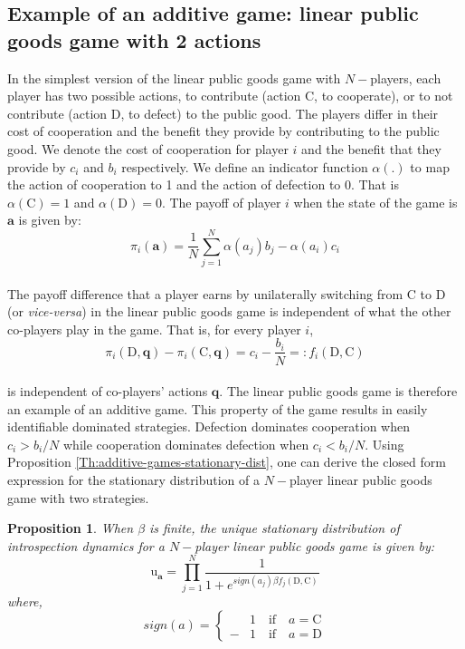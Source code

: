 \documentclass[11pt]{article}
\theoremstyle{plainCl1}
\newtheorem{Prop}{Proposition}
\theoremstyle{plainCl2}
\newcommand{\abf}{\mathbf{a}}
\newcommand{\qbf}{\mathbf{q}}
\newcommand{\C}{\mathrm{C}}
\newcommand{\D}{\mathrm{D}}
\begin{document}
\subsection*{Example of an additive game: linear public goods game with 2 actions}
In the simplest version of the linear public goods game with $N-$players, each player has two possible actions, to contribute (action $\C$, to cooperate), or to not contribute (action $\D$, to defect) to the public good. The players differ in their cost of cooperation and the benefit they provide by contributing to the public good. We denote the cost of cooperation for player $i$ and the benefit that they provide by $c_i$ and $b_i$ respectively. We define an indicator function $\alpha(.)$ to map the action of cooperation to 1 and the action of defection to 0. That is $\alpha(\C) = 1$ and $\alpha(\D) = 0$.  The payoff of player $i$ when the state of the game is $\abf$ is given by: \\
\begin{equation}
\pi_i(\abf) = \frac{1}{N}\sum_{j=1}^N \displaystyle \alpha(a_j) b_j - \alpha(a_i) c_i
\label{Eq:linear-pgg-payoff}
\end{equation}
\\
\noindent The payoff difference that a player earns by unilaterally switching from $\C$ to $\D$ (or \emph{vice-versa}) in the linear public goods game is independent of what the other co-players play in the game. That is, for every player $i$,
\begin{equation}
\pi_i(\D, \qbf) - \pi_i(\C, \qbf) = c_i - \frac{b_i}{N} =: f_i(\D, \C) 
\label{Eq:difference-payoffs-lpgg}
\end{equation}\\
\noindent is independent of co-players' actions $\qbf$. The linear public goods game is therefore an example of an additive game. This property of the game results in easily identifiable dominated strategies. Defection dominates cooperation when $c_i > b_i/N$ while cooperation dominates defection when $c_i < b_i/N$. Using Proposition \ref{Th:additive-games-stationary-dist}, one can derive the closed form expression for the stationary distribution of a $N-$player linear public goods game with two strategies. 
\begin{Prop}
\label{prop:stationary-dist-lpgg}
When $\beta$ is finite, the unique stationary distribution of introspection dynamics for a $N-$player linear public goods game is given by: 
\\
\begin{equation}
\mathrm{u}_\abf = \prod_{j = 1}^{N} \frac{1}{1 + \displaystyle e^{\mathit{sign}(a_j)\beta f_j(\D, \C )}} 
\label{Eq:stationary_dist_lpgg}
\end{equation}
where, 
\begin{equation}
\label{Eq:sign-function}
\mathit{sign}(a) =
\begin{cases}
&1 \quad \text{if} \quad a = \C \\
-&1 \quad \text{if} \quad a = \D
\end{cases}
\end{equation} \\
\end{Prop}
\end{document}
